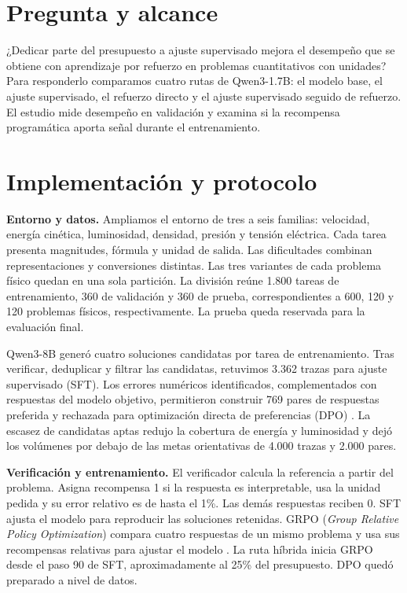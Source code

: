 \section{Pregunta y alcance}
¿Dedicar parte del presupuesto a ajuste supervisado mejora el desempeño que
se obtiene con aprendizaje por refuerzo en problemas cuantitativos con unidades?
Para responderlo comparamos cuatro rutas de Qwen3-1.7B: el modelo base, el ajuste
supervisado, el refuerzo directo y el ajuste supervisado seguido de refuerzo.
El estudio mide desempeño en validación y examina si la recompensa programática
aporta señal durante el entrenamiento.

\section{Implementación y protocolo}

\textbf{Entorno y datos.} Ampliamos el entorno de tres a seis familias: velocidad,
energía cinética, luminosidad, densidad, presión y tensión eléctrica. Cada tarea
presenta magnitudes, fórmula y unidad de salida. Las dificultades combinan
representaciones y conversiones distintas. Las tres variantes de cada problema
físico quedan en una sola partición. La división reúne 1.800 tareas de
entrenamiento, 360 de validación y 360 de prueba, correspondientes a 600, 120 y
120 problemas físicos, respectivamente. La prueba queda reservada para la
evaluación final.

Qwen3-8B generó cuatro soluciones candidatas por tarea de entrenamiento.
Tras verificar, deduplicar y filtrar las candidatas, retuvimos 3.362 trazas
para ajuste supervisado (SFT). Los errores numéricos identificados, complementados
con respuestas del modelo objetivo, permitieron construir 769 pares de respuestas
preferida y rechazada para optimización directa de preferencias (DPO)
\cite{dpo}. La escasez de candidatas aptas redujo la cobertura de energía y
luminosidad y dejó los volúmenes por debajo de las metas orientativas de 4.000
trazas y 2.000 pares.

\textbf{Verificación y entrenamiento.} El verificador calcula la referencia
a partir del problema. Asigna recompensa 1 si la respuesta es interpretable,
usa la unidad pedida y su error relativo es de hasta el 1\%. Las demás
respuestas reciben 0. SFT ajusta el modelo para reproducir las soluciones
retenidas. GRPO (\textit{Group Relative Policy Optimization}) compara cuatro
respuestas de un mismo problema y usa sus
recompensas relativas para ajustar el modelo \cite{deepseekmath}. La ruta
híbrida inicia GRPO desde el paso 90 de SFT, aproximadamente al 25\% del
presupuesto. DPO quedó preparado a nivel de datos.

